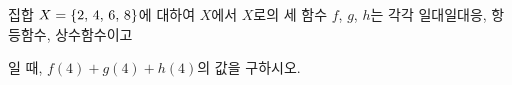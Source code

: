 \hspace*{2mm}\begin{minipage}[t]{\dimexpr\linewidth-2mm\relax}\vspace{0pt}
집합 $X=\{2,\mkern3mu 4,\mkern3mu 6,\mkern3mu 8\}$에 대하여 $X$에서 $X$로의 세 함수 $f$, $g$, $h$는 각각 일대일대응, 항등함수, 상수함수이고\par\smallskip{}\par\smallskip\noindent 일 때, $f(4)+g(4)+h(4)$의 값을 구하시오.\end{minipage}

